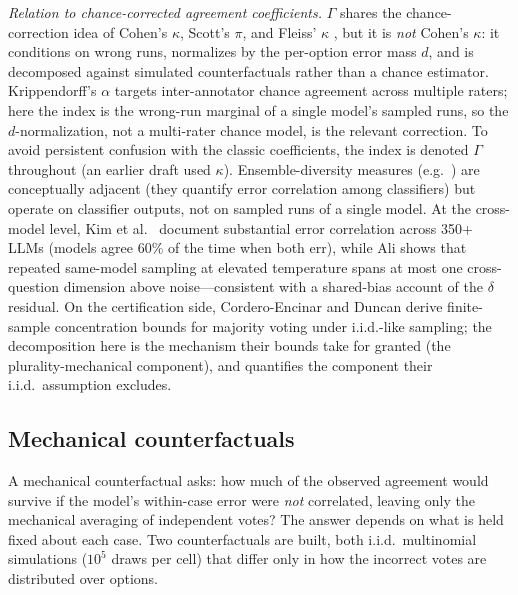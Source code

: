\documentclass[a4paper,fleqn]{cas-sc}
\newcommand{\agreementIndex}{\Gamma}
\begin{document}
\emph{Relation to chance-corrected agreement coefficients.}
$\agreementIndex$ shares the chance-correction idea of Cohen's $\kappa$, Scott's
$\pi$, and Fleiss' $\kappa$
\cite{cohen1960,scott1955,fleiss1971,krippendorff1970}, but it is
\emph{not} Cohen's $\kappa$: it conditions on wrong runs, normalizes by
the per-option error mass $d$, and is decomposed against simulated
counterfactuals rather than a chance estimator. Krippendorff's $\alpha$
targets inter-annotator chance agreement across multiple raters; here the
index is the wrong-run marginal of a single model's sampled runs, so the
$d$-normalization, not a multi-rater chance model, is the relevant
correction. To avoid persistent
confusion with the classic coefficients, the index is denoted $\Gamma$
throughout (an earlier draft used $\kappa$).
Ensemble-diversity measures
(e.g.\ \cite{kuncheva2003}) are
conceptually adjacent (they quantify error correlation among
classifiers) but operate on classifier outputs, not on sampled runs of a
single model. At the cross-model level, Kim et al.~\cite{kim2025correlated}
document substantial error correlation across 350+ LLMs (models agree
60\% of the time when both err), while Ali \cite{ali2026stochastic} shows
that repeated same-model sampling at elevated temperature spans at most
one cross-question dimension above noise---consistent with a
shared-bias account of the $\delta$ residual. On the certification side,
Cordero-Encinar and Duncan \cite{corderoencinar2025certified} derive
finite-sample concentration bounds for majority voting under
i.i.d.-like sampling; the decomposition here is the mechanism their
bounds take for granted (the plurality-mechanical component), and
quantifies the component their i.i.d.\ assumption excludes.

\subsection{Mechanical counterfactuals}
\label{sec:iid}

A mechanical counterfactual asks: how much of the observed agreement
would survive if the model's within-case error were \emph{not}
correlated, leaving only the mechanical averaging of independent votes?
The answer depends on what is held fixed about each case. Two counterfactuals are built, both i.i.d.\ multinomial simulations ($10^5$ draws per
cell) that differ only in how the incorrect votes are distributed over
options.
\end{document}
